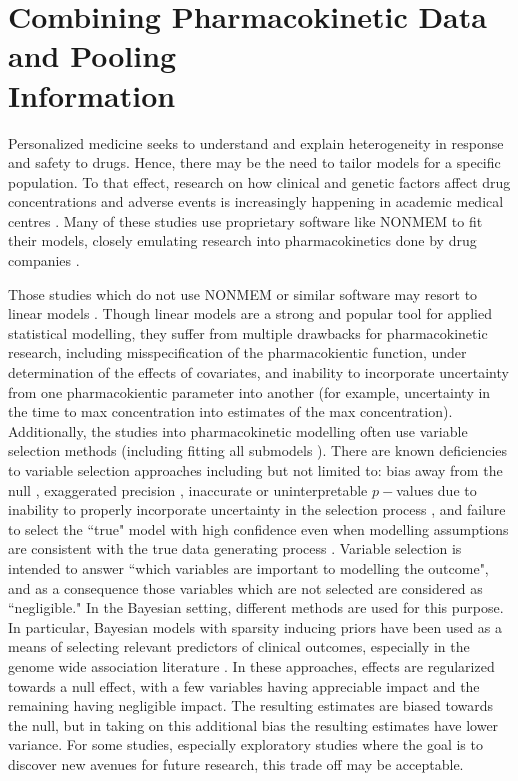 \section{Combining Pharmacokinetic Data and Pooling\\ Information}

Personalized medicine seeks to understand and explain heterogeneity in response and safety to drugs.  Hence, there may be the need to tailor models for a specific population.  To that effect, research on how clinical and genetic factors affect drug concentrations and adverse events is increasingly happening in academic medical centres  \cite{gibert_development_2022, gulilat_association_2022, peretz_pharmacokinetics_2021, gulilat_drug_2020, sturkenboom_population_2021}.  Many of these studies use proprietary software like NONMEM \cite{bauer2011nonmem} to fit their models, closely emulating research into pharmacokinetics done by drug companies \cite{cirincione2018population,ueshima2018population}.  

Those studies which do not use NONMEM or similar software may resort to linear models \cite{gulilat2020drug}.  Though linear models are a strong and popular tool for applied statistical modelling, they suffer from multiple drawbacks for pharmacokinetic research, including misspecification of the pharmacokientic function, under determination of the effects of covariates, and inability to incorporate uncertainty from one pharmacokientic parameter into another (for example, uncertainty in the time to max concentration into estimates of the max concentration).  Additionally, the studies into pharmacokinetic modelling often use variable selection methods (including fitting all submodels \cite{cirincione2018population,ueshima2018population}).  There are known deficiencies to variable selection approaches including but not limited to: bias away from the null \cite{whittingham2006we}, exaggerated precision \cite{altman1989bootstrap}, inaccurate or uninterpretable $p-$values due to inability to properly incorporate uncertainty in the selection process \cite{harrell2015regression}, and failure to select the ``true" model with high confidence even when modelling assumptions are consistent with the true data generating process \cite{smith2018step}.  Variable selection is intended to answer ``which variables are important to modelling the outcome", and as a consequence those variables which are not selected are considered as ``negligible."  In the Bayesian setting, different methods are used for this purpose.  In particular, Bayesian models with sparsity inducing priors have been used as a means of selecting relevant predictors of clinical outcomes, especially in the genome wide association literature \cite{ni2019bayesian, armero2019two, zhou2013polygenic}.  In these approaches, effects are regularized towards a null effect, with a few variables having appreciable impact and the remaining having negligible impact. The resulting estimates are biased towards the null, but in taking on this additional bias the resulting estimates have lower variance.  For some studies, especially exploratory studies where the goal is to discover new avenues for future research, this trade off may be acceptable.

